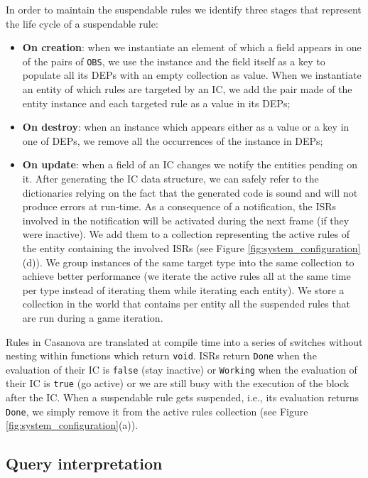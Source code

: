 In order to maintain the suspendable rules we identify three stages that represent the life cycle of a suspendable rule:

\begin{itemize}
\item \textbf{On creation}: when we instantiate an element of which a field appears in one of the pairs of \texttt{OBS}, we use the instance and the field itself as a key to populate all its DEPs with an empty collection as value. When we instantiate an entity of which rules are targeted by an IC, we add the pair made of the entity instance and each targeted rule as a value in its DEPs;
\item \textbf{On destroy}: when an instance which appears either as a value or a key in one of DEPs, we remove all the occurrences of the instance in DEPs;
\item \textbf{On update}: when a field of an IC changes we notify the entities pending on it. After generating the IC data structure, we can safely refer to the dictionaries relying on the fact that the generated code is sound and will not produce errors at run-time. As a consequence of a notification, the ISRs involved in the notification will be activated during the next frame (if they were inactive). We add them to a collection representing the active rules of the entity containing the involved ISRs (see Figure \ref{fig:system_configuration}(d)). We group instances of the same target type into the same collection to achieve better performance (we iterate the active rules all at the same time per type instead of iterating them while iterating each entity). We store a collection in the world that contains per entity all the suspended rules that are run during a game iteration.
\end{itemize}


Rules in Casanova are translated at compile time into a series of switches without nesting within functions which return \texttt{void}. ISRs return \texttt{Done} when the evaluation of their IC is \texttt{false} (stay inactive) or \texttt{Working} when the evaluation of their IC is \texttt{true} (go active) or we are still busy with the execution of the block after the IC. When a suspendable rule gets suspended, i.e., its evaluation returns \texttt{Done}, we simply remove it from the active rules collection (see Figure \ref{fig:system_configuration}(a)).

\subsection{Query interpretation}


